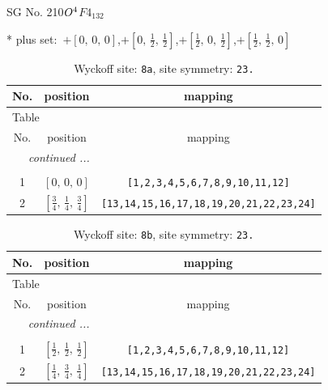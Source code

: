 \documentclass[fleqn,8pt]{jsarticle}
\begin{document}
\setcounter{MaxMatrixCols}{32}

\renewcommand{\tablename}{Table~}
\renewcommand{\figurename}{Figure~}
\begin{center}
\LARGE
SG No. 210\quad$O_{\rm }^{4}$\quad$F4_132$\quad[ cubic ]
\end{center}
* plus set:\,\,\,$+\left[ 0,\, 0,\, 0 \right]$,\quad $+\left[ 0,\, \frac{1}{2},\, \frac{1}{2} \right]$,\quad $+\left[ \frac{1}{2},\, 0,\, \frac{1}{2} \right]$,\quad $+\left[ \frac{1}{2},\, \frac{1}{2},\, 0 \right]$
\renewcommand{\arraystretch}{1.2}
\begin{longtable}{ccc}
\caption{Wyckoff site: {\tt 8a}, site symmetry: {\tt 23.}}
 \\
 \hline \hline
No. & position & mapping \\ \hline \endfirsthead

\multicolumn{2}{l}{\tablename\ \thetable{}} \\
 \hline \hline
No. & position & mapping \\ \hline \endhead

 \hline \hline
\multicolumn{2}{r}{\footnotesize\it continued ...} \\ \endfoot

 \hline \hline
\multicolumn{2}{r}{} \\ \endlastfoot

1 & $\left[ 0,\, 0,\, 0 \right]$ & {\tt [1,2,3,4,5,6,7,8,9,10,11,12]} \\ \hline
2 & $\left[ \frac{3}{4},\, \frac{1}{4},\, \frac{3}{4} \right]$ & {\tt [13,14,15,16,17,18,19,20,21,22,23,24]} \\
\end{longtable}
\renewcommand{\arraystretch}{1.2}
\begin{longtable}{ccc}
\caption{Wyckoff site: {\tt 8b}, site symmetry: {\tt 23.}}
 \\
 \hline \hline
No. & position & mapping \\ \hline \endfirsthead

\multicolumn{2}{l}{\tablename\ \thetable{}} \\
 \hline \hline
No. & position & mapping \\ \hline \endhead

 \hline \hline
\multicolumn{2}{r}{\footnotesize\it continued ...} \\ \endfoot

 \hline \hline
\multicolumn{2}{r}{} \\ \endlastfoot

1 & $\left[ \frac{1}{2},\, \frac{1}{2},\, \frac{1}{2} \right]$ & {\tt [1,2,3,4,5,6,7,8,9,10,11,12]} \\ \hline
2 & $\left[ \frac{1}{4},\, \frac{3}{4},\, \frac{1}{4} \right]$ & {\tt [13,14,15,16,17,18,19,20,21,22,23,24]} \\
\end{longtable}
\end{document}
